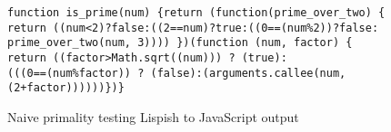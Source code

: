\begin{figure}[ht]
\begin{verbatim}
function is_prime(num) {return (function(prime_over_two) { 
return ((num<2)?false:((2==num)?true:((0==(num%2))?false:
prime_over_two(num, 3)))) })(function (num, factor) {
return ((factor>Math.sqrt((num))) ? (true):
(((0==(num%factor)) ? (false):(arguments.callee(num, (2+factor))))))})}
\end{verbatim}
\caption{Naive primality testing Lispish to JavaScript output}
\label{fig:primality-checking-output}
\end{figure}
